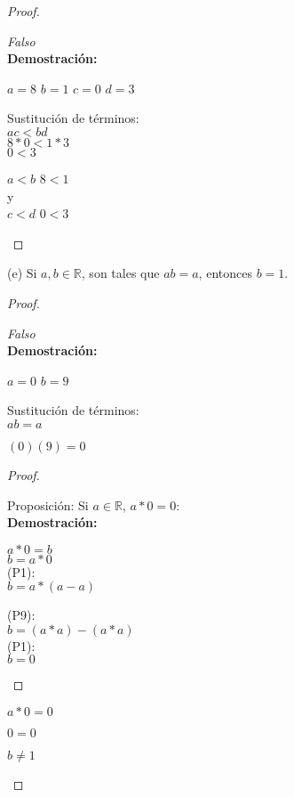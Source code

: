 \documentclass[12pt, a4paper]{article}
\begin{document}
    \begin{proof}
        \begin{center}
            \textit{Falso}\\
            \textbf{Demostración:}

            $a = 8$ $b = 1$ $c = 0$ $d = 3$

            Sustitución de términos:\\
            $ac < bd$\\
            $8*0<1*3$\\
            $0<3$

            $a<b$  $8<1$\\
            y\\
            $c<d$  $0<3$

        \end{center}
    \end{proof}
(e) Si $a,b \in \mathbb{R}$, son tales que $ab = a$, entonces $b = 1$.
    \begin{proof}
        \begin{center}
            \textit{Falso}\\
            \textbf{Demostración:}

            $a = 0$ $b = 9$

            Sustitución de términos:\\
            $ab = a$

            $(0)(9)=0$

            \begin{proof}
                \begin{center}
                    Proposición: Si $a \in \mathbb{R}$, $a*0=0$:\\
                \textbf{Demostración:}

                    $a*0=b$\\
                    $b=a*0$\\

                    (P1):\\
                    $b=a*(a-a)$

                    (P9):\\
                    $b=(a*a)-(a*a)$\\

                    (P1):\\
                    $b=0$\\
                \end{center}
            \end{proof}
            
            $a*0=0$

            $0 = 0$

            $b \neq 1$

        \end{center}
    \end{proof}
\end{document}
